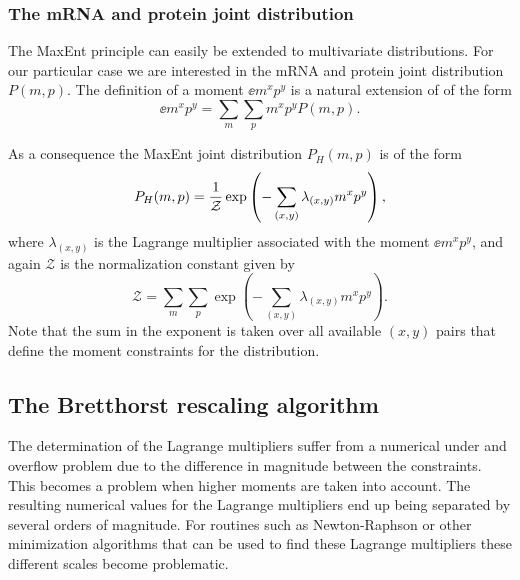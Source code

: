 \subsubsection{The mRNA and protein joint distribution}

The MaxEnt principle can easily be extended to multivariate distributions. For
our particular case we are interested in the mRNA and protein joint distribution
$P(m, p)$. The definition of a moment $\ee{m^x p^y}$ is a natural extension of
 of the form
\begin{equation}
  \ee{m^x p^y} = \sum_m \sum_p m^x p^y P(m, p).
\end{equation}

As a consequence the MaxEnt joint distribution $P_H(m, p)$ is of the form
\begin{equation}
  P_H(m, p) = {1 \over \mathcal{Z}}
              \exp \left( - \sum_{(x,y)} \lambda_{(x,y)} m^x p^y \right),
  \label{eq_maxEnt_joint}
\end{equation}
where $\lambda_{(x,y)}$ is the Lagrange multiplier associated with the moment
$\ee{m^x p^y}$, and again $\mathcal{Z}$ is the normalization constant given by
\begin{equation}
  \mathcal{Z} = \sum_m \sum_p
              \exp \left( - \sum_{(x, y)} \lambda_{(x, y)} m^x p^y \right).
\end{equation}
Note that the sum in the exponent is taken over all available $(x, y)$ pairs
that define the moment constraints for the distribution.

\subsection{The Bretthorst rescaling algorithm}

The determination of the Lagrange multipliers suffer from a numerical under and
overflow problem due to the difference in magnitude between the constraints.
This becomes a problem when higher moments are taken into account. The resulting
numerical values for the Lagrange multipliers end up being separated by several
orders of magnitude. For routines such as Newton-Raphson or other minimization
algorithms that can be used to find these Lagrange multipliers these different
scales become problematic.


